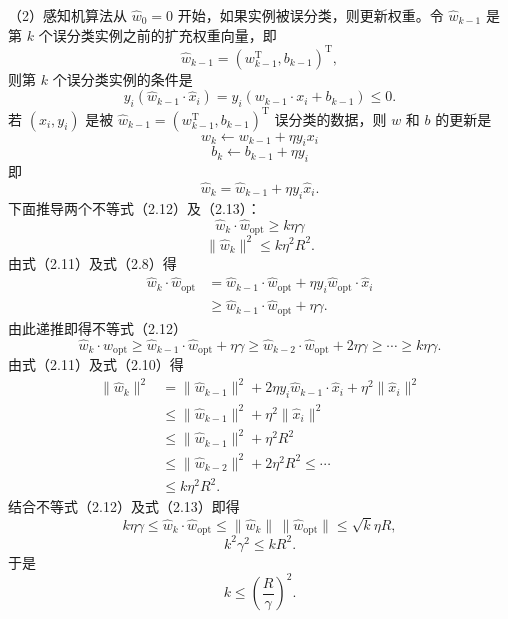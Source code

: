 \documentclass[UTF8,12pt,a4paper,fontset=fandol]{ctexart}
\begin{document}
（2）感知机算法从 $\hat{w}_0=0$ 开始，如果实例被误分类，则更新权重。令 $\hat{w}_{k-1}$ 是第 $k$ 个误分类实例之前的扩充权重向量，即
\[
  \hat{w}_{k-1}=(w_{k-1}^\mathrm{T},b_{k-1})^\mathrm{T},
\]
则第 $k$ 个误分类实例的条件是
\begin{equation}
  y_i(\hat{w}_{k-1}\cdot\hat{x}_i)=y_i(w_{k-1}\cdot x_i+b_{k-1})\le 0.
  \tag{2.10}
\end{equation}
若 $(x_i,y_i)$ 是被 $\hat{w}_{k-1}=(w_{k-1}^\mathrm{T},b_{k-1})^\mathrm{T}$ 误分类的数据，则 $w$ 和 $b$ 的更新是
\[
  w_k\leftarrow w_{k-1}+\eta y_ix_i
\]
\[
  b_k\leftarrow b_{k-1}+\eta y_i
\]
即
\begin{equation}
  \hat{w}_k=\hat{w}_{k-1}+\eta y_i\hat{x}_i.
  \tag{2.11}
\end{equation}
下面推导两个不等式（2.12）及（2.13）：
\begin{equation}
  \hat{w}_k\cdot\hat{w}_{\mathrm{opt}}\ge k\eta\gamma
  \tag{2.12}
\end{equation}
\begin{equation}
  \|\hat{w}_k\|^2\le k\eta^2R^2.
  \tag{2.13}
\end{equation}
由式（2.11）及式（2.8）得
\[
\begin{aligned}
  \hat{w}_k\cdot\hat{w}_{\mathrm{opt}}
  &=\hat{w}_{k-1}\cdot\hat{w}_{\mathrm{opt}}
    +\eta y_i\hat{w}_{\mathrm{opt}}\cdot\hat{x}_i\\
  &\ge \hat{w}_{k-1}\cdot\hat{w}_{\mathrm{opt}}+\eta\gamma.
\end{aligned}
\]
由此递推即得不等式（2.12）
\[
  \hat{w}_k\cdot\hat{w}_{\mathrm{opt}}
  \ge \hat{w}_{k-1}\cdot\hat{w}_{\mathrm{opt}}+\eta\gamma
  \ge \hat{w}_{k-2}\cdot\hat{w}_{\mathrm{opt}}+2\eta\gamma
  \ge\cdots\ge k\eta\gamma.
\]
由式（2.11）及式（2.10）得
\[
\begin{aligned}
  \|\hat{w}_k\|^2
  &=\|\hat{w}_{k-1}\|^2+2\eta y_i\hat{w}_{k-1}\cdot\hat{x}_i
    +\eta^2\|\hat{x}_i\|^2\\
  &\le \|\hat{w}_{k-1}\|^2+\eta^2\|\hat{x}_i\|^2\\
  &\le \|\hat{w}_{k-1}\|^2+\eta^2R^2\\
  &\le \|\hat{w}_{k-2}\|^2+2\eta^2R^2\le\cdots\\
  &\le k\eta^2R^2.
\end{aligned}
\]
结合不等式（2.12）及式（2.13）即得
\[
  k\eta\gamma\le \hat{w}_k\cdot\hat{w}_{\mathrm{opt}}
  \le \|\hat{w}_k\|\,\|\hat{w}_{\mathrm{opt}}\|
  \le \sqrt{k}\eta R,
\]
\[
  k^2\gamma^2\le kR^2.
\]
于是
\[
  k\le\left(\frac{R}{\gamma}\right)^2.
\]
\end{document}

